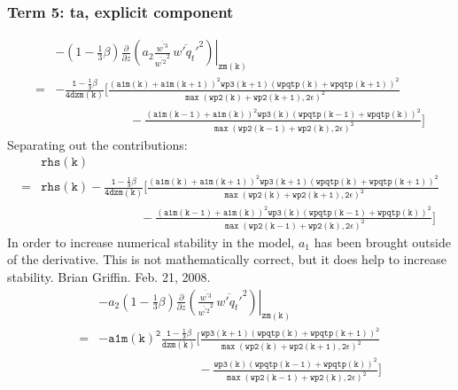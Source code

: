 \documentclass[11pt,fleqn]{article}
\newcommand{\ptlder}[2]{\frac{\partial #1}{\partial #2}}
\begin{document}
\subsubsection{Term 5:  ta, explicit component}

\begin{equation}
\begin{split}
& - \left. \left( 1 - \frac{1}{3}\beta \right)
       \ptlder{}{z}
         \left( 
           a_2
           \frac{\overline{w^{'3}}}{\overline{w^{'2}}^2} \,
           \overline{w'q_t'}^2
         \right) \right|_{\mathtt{zm(k)}} \\
=& \mathtt{
   - \frac{1 - \frac{1}{3}\beta}{4 dzm(k)}
     \bigg[ \frac{\left(a1m(k)+a1m(k+1)\right)^2 wp3(k+1) \left(wpqtp(k)+wpqtp(k+1)\right)^2}
                 {\max\left(wp2(k)+wp2(k+1),2\epsilon\right)^2} } \\
 & \mathtt{ \quad \quad \quad \quad \quad \quad
           -\frac{\left(a1m(k-1)+a1m(k)\right)^2 wp3(k) \left(wpqtp(k-1)+wpqtp(k)\right)^2}
                 {\max\left(wp2(k-1)+wp2(k),2\epsilon\right)^2}
     \bigg]
   }
\end{split}
\end{equation}
%
Separating out the contributions:
%
\begin{equation}
\begin{split}
&\mathtt{rhs(k)} \\
=& \mathtt{
   rhs(k)
   - \frac{1 - \frac{1}{3}\beta}{4 dzm(k)}
     \bigg[ \frac{\left(a1m(k)+a1m(k+1)\right)^2 wp3(k+1) \left(wpqtp(k)+wpqtp(k+1)\right)^2}
                 {\max\left(wp2(k)+wp2(k+1),2\epsilon\right)^2} } \\
 & \mathtt{ \quad \quad \quad \quad \quad \quad \quad \quad
           -\frac{\left(a1m(k-1)+a1m(k)\right)^2 wp3(k) \left(wpqtp(k-1)+wpqtp(k)\right)^2}
                 {\max\left(wp2(k-1)+wp2(k),2\epsilon\right)^2}
     \bigg]
   }
\end{split}
\end{equation}
%
In order to increase numerical stability in the model, $a_{1}$ has been brought
outside of the derivative.  This is not mathematically correct, but it does 
help to increase stability.  Brian Griffin.  Feb. 21, 2008.
% 
\begin{equation}
\begin{split}
& - \left. a_2 \left( 1 - \frac{1}{3}\beta \right)
       \ptlder{}{z}
         \left( 
           \frac{\overline{w^{'3}}}{\overline{w^{'2}}^2} \,
           \overline{w'q_t'}^2
         \right) \right|_{\mathtt{zm(k)}} \\
=& \mathtt{
   - a1m(k)^{2}\frac{1 - \frac{1}{3}\beta}{dzm(k)}
     \bigg[ \frac{wp3(k+1) \left(wpqtp(k)+wpqtp(k+1)\right)^2}
                 {\max\left(wp2(k)+wp2(k+1),2\epsilon\right)^2} } \\
 & \mathtt{ \quad \quad \quad \quad \quad \quad \quad \quad
           -\frac{wp3(k) \left(wpqtp(k-1)+wpqtp(k)\right)^2}
                 {\max\left(wp2(k-1)+wp2(k),2\epsilon\right)^2}
     \bigg]
   }
\end{split}
\end{equation}
\end{document}
